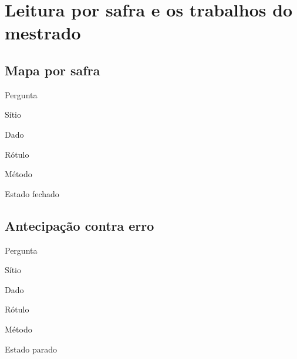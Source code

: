 \chapter{Leitura por safra e os trabalhos do mestrado}
\label{cap:produto-crop}

\lipsum[21][1-4]

\section{Mapa por safra}

\begin{ficha}
  \item[Pergunta] \lipsum[22][1]
  \item[Sítio]    \lipsum[23][2]
  \item[Dado]     \lipsum[24][3]
  \item[Rótulo]   \lipsum[25][1]
  \item[Método]   \lipsum[26][2]
  \item[Estado]   fechado
\end{ficha}

\lipsum[27][1-5]

\lipsum[28][1-4]

\conclusao{\lipsum[29][1-2]}

\begin{objecao}\lipsum[30][1-3]\end{objecao}


\section{Antecipação contra erro}

\begin{ficha}
  \item[Pergunta] \lipsum[31][1]
  \item[Sítio]    \lipsum[32][2]
  \item[Dado]     \lipsum[33][3]
  \item[Rótulo]   \lipsum[34][1]
  \item[Método]   \lipsum[35][2]
  \item[Estado]   parado
\end{ficha}

\lipsum[36][1-5]

\lipsum[37][1-4]

\conclusao{\lipsum[38][1-2]}

\begin{objecao}\lipsum[39][1-3]\end{objecao}


